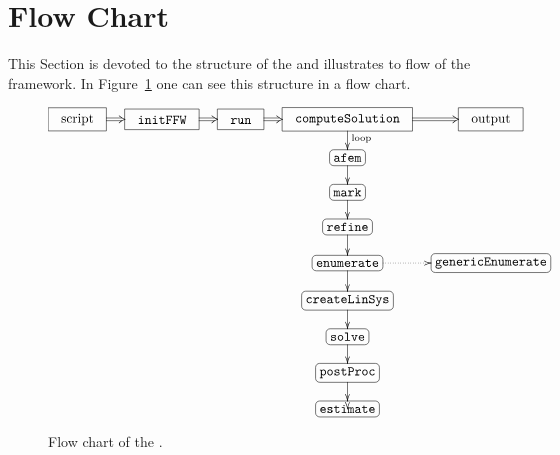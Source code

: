 \section{Flow Chart}
\label{sect:FlowChart}

\noindent This Section is devoted to the structure of the \FFW and illustrates to flow of the framework. In Figure~\ref{sect:FlowChart.fig.FFW-flowchart} one can see this structure in a flow chart.

\begin{figure}[ht!]
\footnotesize
\begin{equation*}
\xymatrix@-1eM{
    *+<2ex>[F]{ \phantom{I}\text{script}\phantom{I} }           \ar@{=>}[r]
&   *+<2ex>[F]{ \phantom{I}\code{initFFW}\phantom{I} }          \ar@{=>}[r]
&   *+<2ex>[F]{ \phantom{I}\code{run}\phantom{I} }              \ar@{=>}[r]
&   *+<2ex>[F]{ \phantom{I}\code{computeSolution}\phantom{I} }  \ar@{=>}[r] \ar@{->}[d]^{\text{loop}}
&   *+<2ex>[F]{ \phantom{I}\text{output}\phantom{I} }
\\
&&&  *+[F-:<3pt>]{ \code{afem} }            \ar@{->}[d]
\\
&&&  *+[F-:<3pt>]{ \code{mark} }            \ar@{->}[d]
\\
&&& *+[F-:<3pt>]{ \code{refine} }          \ar@{->}[d]
\\
&&& *+[F-:<3pt>]{ \code{enumerate} }       \ar@{.>}[r] \ar@{->}[d]
&   *+[F-:<3pt>]{ \code{genericEnumerate} }
\\
&&& *+[F-:<3pt>]{ \code{createLinSys} }    \ar@{->}[d]
\\
&&& *+[F-:<3pt>]{ \code{solve} }           \ar@{->}[d]
\\
&&& *+[F-:<3pt>]{ \code{postProc} }        \ar@{->}[d]
\\
&&& *+[F-:<3pt>]{ \code{estimate} }        \ar@{->}'l[u] '[uu] [uu]
}
\end{equation*}
\normalsize \caption{Flow chart of the \FFW.}\label{sect:FlowChart.fig.FFW-flowchart}
\end{figure}

